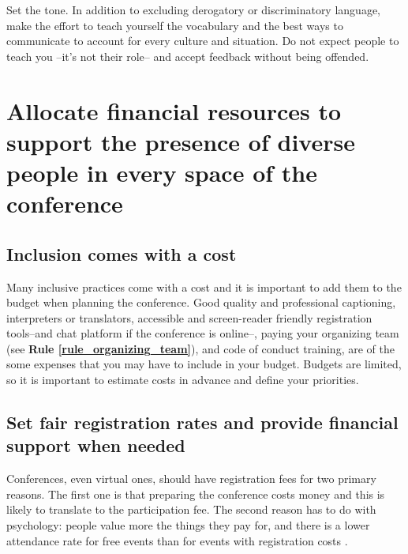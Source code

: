 \documentclass[10pt,letterpaper]{article}
\begin{document}
Set the tone. %
In addition to excluding derogatory or discriminatory language, make the effort to teach yourself the vocabulary and the best ways to communicate to account for every culture and situation. Do not expect people to teach you --it's not their role-- and accept feedback without being offended.


\section{Allocate financial resources to support the presence of diverse people in every space of the conference
}
\label{rule_financial}


\subsection*{Inclusion comes with a cost}

Many inclusive practices come with a cost and it is important to add them to the budget when planning the conference. 
Good quality and professional captioning, interpreters or translators, accessible and screen-reader friendly registration tools--and chat platform if the conference is online--, paying your organizing team (see \textbf{Rule \ref{rule_organizing_team}}), and code of conduct training, are of the some expenses that you may have to include in your budget. 
Budgets are limited, so it is important to estimate costs in advance and define your priorities.

\subsection*{Set fair registration rates and provide financial support when needed}

Conferences, even virtual ones, should have registration fees for two primary reasons. The first one is that preparing the conference costs money and this is likely to translate to the participation fee. The second reason has to do with psychology: people value more the things they pay for, and there is a lower attendance rate for free events than for events with registration costs \cite{eventbrite_ultimate_2017}. 
\end{document}
